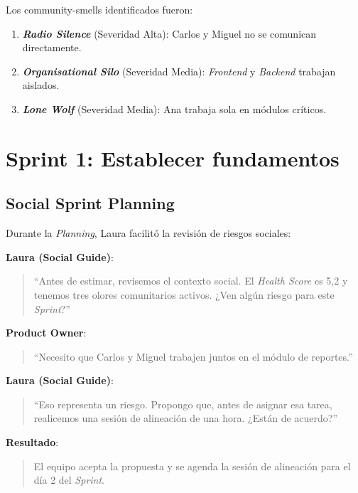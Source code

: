 Los \gls{community-smells} identificados fueron:
\begin{enumerate}
    \item \textbf{\textit{Radio Silence}} (Severidad Alta): Carlos y Miguel no se comunican directamente.
    \item \textbf{\textit{Organisational Silo}} (Severidad Media): \textit{Frontend} y \textit{Backend} trabajan aislados.
    \item \textbf{\textit{Lone Wolf}} (Severidad Media): Ana trabaja sola en módulos críticos.
\end{enumerate}

\section{Sprint 1: Establecer fundamentos}

\subsection{Social Sprint Planning}
Durante la \textit{Planning}, Laura facilitó la revisión de riesgos sociales:

\begin{escenario}

    \textbf{Laura (Social Guide)}:
    \begin{quote}
        ``Antes de estimar, revisemos el contexto social.
        El \textit{Health Score} es 5,2 y tenemos tres olores comunitarios activos.
        ¿Ven algún riesgo para este \textit{Sprint}?''
    \end{quote}

    \textbf{Product Owner}:
    \begin{quote}
        ``Necesito que Carlos y Miguel trabajen juntos en el módulo de reportes.''
    \end{quote}

    \textbf{Laura (Social Guide)}:
    \begin{quote}
        ``Eso representa un riesgo. Propongo que, antes de asignar esa tarea,
        realicemos una sesión de alineación de una hora.
        ¿Están de acuerdo?''
    \end{quote}

    \textbf{Resultado}:
    \begin{quote}
        El equipo acepta la propuesta y se agenda la sesión de alineación para el día 2 del \textit{Sprint}.
    \end{quote}

\end{escenario}


